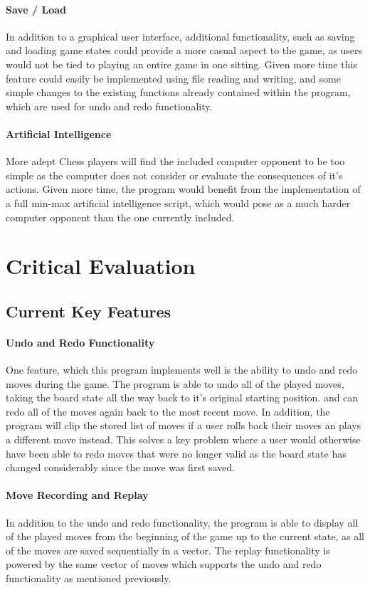 \documentclass[10pt, a4paper]{article}
\begin{document}
	\paragraph{Save / Load}
	In addition to a graphical user interface, additional functionality, such as saving and loading game states could provide a more casual aspect to the game, as users would not be tied to playing an entire game in one sitting. Given more time this feature could easily be implemented using file reading and writing, and some simple changes to the existing functions already contained within the program, which are used for undo and redo functionality.
	\paragraph{Artificial Intelligence}
	More adept Chess players will find the included computer opponent to be too simple as the computer does not consider or evaluate the consequences of it's actions. Given more time, the program would benefit from the implementation of a full min-max artificial intelligence script, which would pose as a much harder computer opponent than the one currently included.
	\section{Critical Evaluation}
	\subsection{Current Key Features}	
	\paragraph{Undo and Redo Functionality}
	One feature, which this program implements well is the ability to undo and redo moves during the game. The program is able to undo all of the played moves, taking the board state all the way back to it's original starting position. and can redo all of the moves again back to the most recent move. In addition, the program will clip the stored list of moves if a user rolls back their moves an plays a different move instead. This solves a key problem where a user would otherwise have been able to redo moves that were no longer valid as the board state has changed considerably since the move was first saved.
	\paragraph{Move Recording and Replay}
	In addition to the undo and redo functionality, the program is able to display all of the played moves from the beginning of the game up to the current state, as all of the moves are saved sequentially in a vector. The replay functionality is powered by the same vector of moves which supports the undo and redo functionality as mentioned previously. 
	
\end{document}
